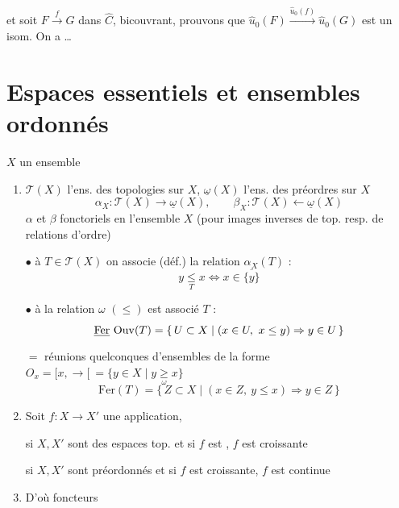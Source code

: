\documentclass[11pt,a4paper]{article}
\begin{document}
et soit $F \xrightarrow{f} G$ dans $\widehat{C}$, bicouvrant, prouvons que
$\widehat{u}_{0}(F) \xrightarrow{\widehat{u}_{0}(f)} \widehat{u}_{0}(G)$ est
 un isom. On a …

\section*{Espaces essentiels et ensembles ordonnés}

$X$ un ensemble

\begin{enumerate}
\item[a)] $\mathcal{T}(X)$ l'ens. des topologies sur $X$, $\underline{\omega}(X)$
l'ens. des préordres sur $X$
\[
\alpha_{X} : \mathcal{T}(X) \longrightarrow \underline{\omega}(X), \qquad
\beta_{X} : \mathcal{T}(X) \longleftarrow \underline{\omega}(X)
\]
$\alpha$ et $\beta$ fonctoriels en l'ensemble $X$ (pour images inverses de top.
resp. de relations d'ordre)

$\bullet$ à $T \in \mathcal{T}(X)$ on associe (déf.) la relation $\alpha_{X}(T)$ :
\[
y \underset{T}{\leq} x \iff x \in \overline{\{y\}}
\]

$\bullet$ à la relation $\omega$ $(\leq)$ est associé $T$ :
\[
\struck{\mathrm{Fer}}\ \mathrm{Ouv}(T) = \{\, U \subset X \mid (x \in U,\ x \leq y)
\Rightarrow y \in U \,\}
\]
$=$ réunions quelconques d'ensembles de la forme
$O_{x} = [x,\rightarrow[\ = \{ y \in X \mid y \underset{\omega}{\geq} x\}$
\[
\mathrm{Fer}(T) = \{\, Z \subset X \mid (x \in Z,\ y \leq x) \Rightarrow y \in Z \,\}
\]

\item[b)] Soit $f : X \to X'$ une application,

si $X, X'$ sont des espaces top. et si $f$ est , $f$ est
croissante

si $X, X'$ sont préordonnés et si $f$ est croissante, $f$ est continue

\item[c)] \struck{\ill{}} D'où foncteurs



\end{enumerate}
\end{document}
